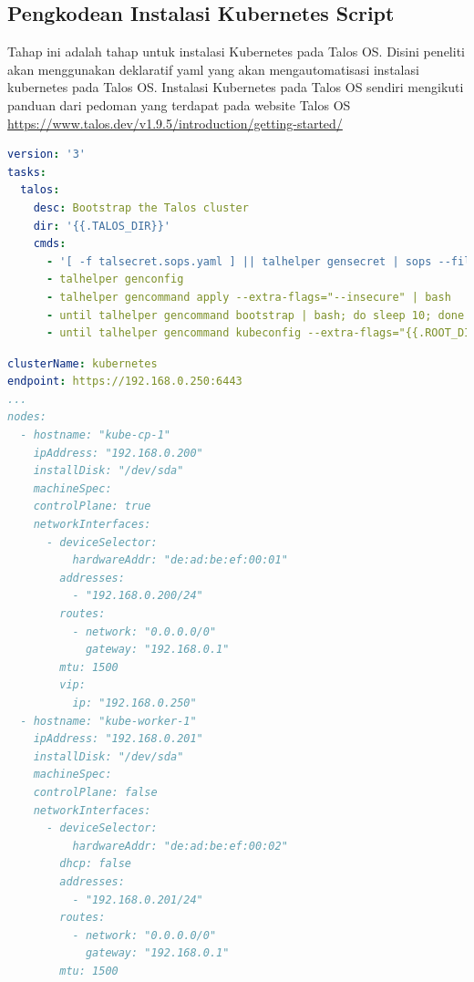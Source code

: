 \subsection{Pengkodean Instalasi Kubernetes Script}
Tahap ini adalah tahap untuk instalasi Kubernetes pada Talos OS. Disini peneliti akan menggunakan deklaratif yaml yang akan mengautomatisasi instalasi kubernetes pada Talos OS.
Instalasi Kubernetes pada Talos OS sendiri mengikuti panduan dari pedoman yang terdapat pada website Talos OS \url{https://www.talos.dev/v1.9.5/introduction/getting-started/}

\begin{table}[!htbp]
    \begin{lstlisting}[language=yaml, basicstyle=\footnotesize\ttfamily]
version: '3'
tasks:
  talos:
    desc: Bootstrap the Talos cluster
    dir: '{{.TALOS_DIR}}'
    cmds:
      - '[ -f talsecret.sops.yaml ] || talhelper gensecret | sops --filename-override talos/talsecret.sops.yaml --encrypt /dev/stdin > talsecret.sops.yaml'
      - talhelper genconfig
      - talhelper gencommand apply --extra-flags="--insecure" | bash
      - until talhelper gencommand bootstrap | bash; do sleep 10; done
      - until talhelper gencommand kubeconfig --extra-flags="{{.ROOT_DIR}} --force" | bash; do sleep 10; done
\end{lstlisting}
    \caption{Konfigurasi script instalasi Kubernetes cluster pada Talos OS}
    \label{tab:yaml-code}
\end{table}
\begin{table}[!htbp]
    \begin{lstlisting}[language=yaml, basicstyle=\footnotesize\ttfamily]
clusterName: kubernetes
endpoint: https://192.168.0.250:6443
...
nodes:
  - hostname: "kube-cp-1"
    ipAddress: "192.168.0.200"
    installDisk: "/dev/sda"
    machineSpec:
    controlPlane: true
    networkInterfaces:
      - deviceSelector:
          hardwareAddr: "de:ad:be:ef:00:01"
        addresses:
          - "192.168.0.200/24"
        routes:
          - network: "0.0.0.0/0"
            gateway: "192.168.0.1"
        mtu: 1500
        vip:
          ip: "192.168.0.250"
  - hostname: "kube-worker-1"
    ipAddress: "192.168.0.201"
    installDisk: "/dev/sda"
    machineSpec:
    controlPlane: false
    networkInterfaces:
      - deviceSelector:
          hardwareAddr: "de:ad:be:ef:00:02"
        dhcp: false
        addresses:
          - "192.168.0.201/24"
        routes:
          - network: "0.0.0.0/0"
            gateway: "192.168.0.1"
        mtu: 1500
\end{lstlisting}
    \caption{Konfigurasi script instalasi Kubernetes cluster pada Talos OS}
    \label{tab:yaml-code-2}
\end{table}
